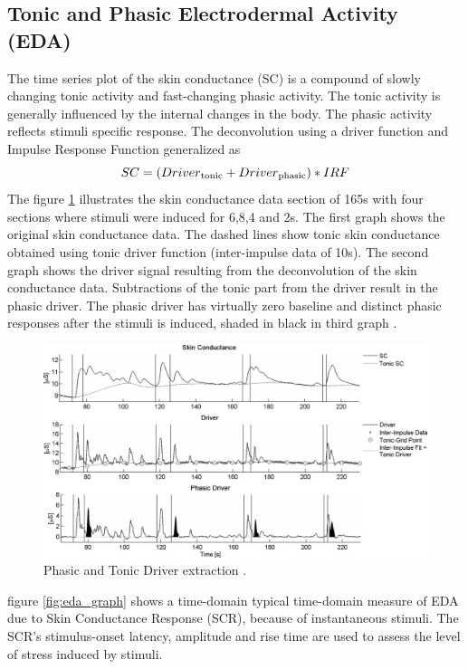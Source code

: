 \subsection{Tonic and Phasic Electrodermal Activity (EDA)}
\label{sec:tonic_phasic_eda}
The time series plot of the skin conductance (SC) is a compound of slowly changing tonic activity and fast-changing phasic activity. The tonic activity is generally influenced by the internal changes in the body. The phasic activity reflects stimuli specific response. The deconvolution using a driver function and Impulse Response Function generalized as
$$SC = (Driver\textsubscript{tonic} + Driver\textsubscript{phasic})*IRF$$
The figure \ref{fig:phasic_tonic_eda} illustrates the skin conductance data section of 165s with four sections where stimuli were induced for 6,8,4 and 2s. The first graph shows the original skin conductance data. The dashed lines show tonic skin conductance obtained using tonic driver function (inter-impulse data of 10s). The second graph shows the driver signal resulting from the deconvolution of the skin conductance data. Subtractions of the tonic part from the driver result in the phasic driver. The phasic driver has virtually zero baseline and distinct phasic responses after the stimuli is induced, shaded in black in third graph \cite{benedek_continuous_2010}.
\begin{figure}
    \centering
    \includegraphics[width=150mm]{Figures/phasic_tonic_eda.jpg}
    \caption{Phasic and Tonic Driver extraction \cite{benedek_continuous_2010}.}
    \label{fig:phasic_tonic_eda}
\end{figure}


figure \ref{fig:eda_graph} shows a time-domain typical time-domain measure of EDA due to Skin Conductance Response (SCR), because of instantaneous stimuli. The SCR’s stimulus-onset latency, amplitude and rise time are used to assess the level of stress induced by stimuli. 







